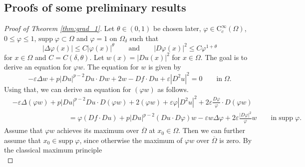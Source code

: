 \documentclass[11pt,reqno]{amsart}
\numberwithin{figure}{section}
\theoremstyle{plain}
\theoremstyle{remark}
\numberwithin{equation}{section}
\begin{document}







\begin{appendices}
\section{Proofs of some preliminary results}
\begin{proof}[Proof of Theorem \ref{thm:grad_1}] Let $\theta\in (0,1)$ be chosen later, $\varphi\in \mathrm{C}_c^\infty(\Omega)$, $0\leq \varphi\leq 1$, $\mathrm{supp}\;\varphi\subset \Omega$ and $\varphi = 1$ on $\Omega_\delta$ such that
\begin{equation}\label{e:ass_power}
    |\Delta \varphi(x)| \leq C|\varphi(x)|^\theta \qquad\text{and}\qquad |D \varphi(x)|^2 \leq C\varphi^{1+\theta}
\end{equation}
for $x\in \Omega$ and $C = C(\delta,\theta)$.
Let $w(x) = |Du(x)|^2$ for $x\in \Omega$. The goal is to derive an equation for $\varphi w$. The equation for $w$ is given by
\begin{equation*}
    -\varepsilon \Delta w + p|D u|^{p-2}D u \cdot D w + 2  w - D f\cdot D u + \varepsilon |D^2u|^2 = 0 \qquad\text{in}\;\Omega.
\end{equation*}
Using that, we can derive an equation for $(\varphi w)$ as follows.
\begin{align*}
    &-\varepsilon \Delta (\varphi w) + p|D u|^{p-2}D u \cdot D (\varphi w) + 2  (\varphi w) + \varepsilon \varphi|D^2u|^2 + 2\varepsilon \frac{D \varphi}{\varphi}\cdot D (\varphi w) \\
    &\qquad\qquad\qquad\qquad = \varphi(D f\cdot D u) + p|D u|^{p-2}(D u\cdot D \varphi)w -\varepsilon w \Delta \varphi + 2\varepsilon \frac{|D \varphi|^2}{\varphi}w
    \qquad\text{in}\;\mathrm{supp}\;\varphi.
\end{align*}
Assume that $\varphi w$ achieves its maximum over $\overline{\Omega}$ at $x_0\in \Omega$. Then we can further assume that $x_0\in \mathrm{supp}\;\varphi$, since otherwise the maximum of $\varphi w$ over $\overline{\Omega}$ is zero. By the classical maximum principle 
\begin{equation*}

\end{equation*}
\end{proof}
\end{appendices}
\end{document}

